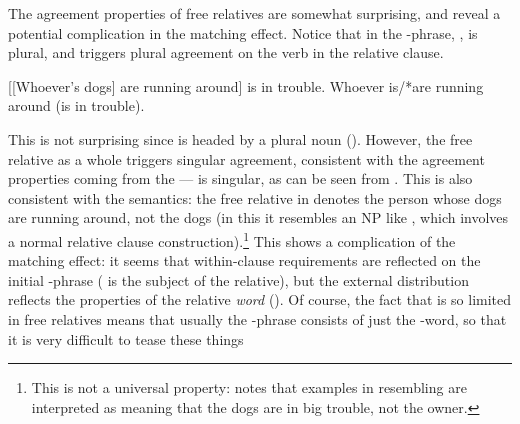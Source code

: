 \documentclass[output=paper
 	        ,biblatex
                ,babelshorthands
                ,newtxmath
                ,draftmode
                ,colorlinks, citecolor=brown
]{langscibook}
\begin{document}
The agreement properties of free relatives are somewhat surprising, and reveal a potential
complication in the matching effect. Notice that in  the -phrase,
, is plural, and triggers plural agreement on the verb in the relative
clause.
\begin{exe}\ex\label{x:rc-154}
  \begin{xlist}
    \ex\label{x:rc-155} {}[[Whoever's dogs] are running around] is in trouble.
    \ex\label{x:rc-156} Whoever is/*are running around (is in trouble).
  \end{xlist}
\end{exe}
This is not surprising since  is headed by a plural noun
(). However, the free relative as a whole triggers singular agreement,
consistent with the agreement properties coming from the  ---
 is singular, as can be seen from . This is also consistent with
the semantics: the free relative in  denotes the person whose dogs are running
around, not the dogs (in this it resembles an NP like , which involves a normal relative clause construction).\footnote{This is not a
  universal property: \citet{Borsley:08} notes that examples in  resembling
   are interpreted as meaning that the dogs are in big trouble, not the owner.}
This shows a complication of the matching effect: it seems that within-clause requirements
are reflected on the initial -phrase ( is the subject of the
relative), but the external distribution reflects the properties of the relative
\emph{word} (). Of course, the fact that  is so limited
in free relatives means that usually the -phrase consists of just the
-word, so that it is very difficult to tease these things
\end{document}
